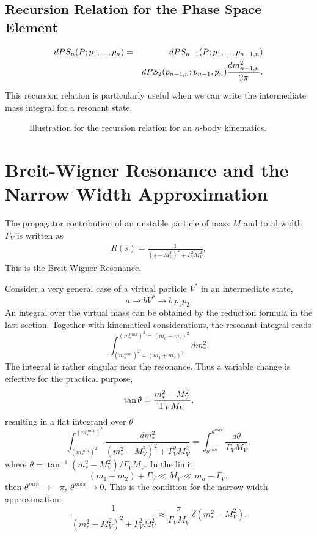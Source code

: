 \documentclass[prd,aps,floats,preprintnumbers,preprint,superscriptaddress,floatfix,nofootinbib]{revtex4}
\def\be{\begin{equation}}
\def\ee{\end{equation}}
\def\bea{\begin{eqnarray}}
\def\eea{\end{eqnarray}}
\begin{document}
\subsection{Recursion Relation for the Phase Space Element}
\label{rec}
\bea
\nonumber
dPS_n(P; p_1,...,p_n) &=& dPS_{n-1}(P; p_1,...,p_{n-1,n}) \\
                    && dPS_2(p_{n-1,n}; p_{n-1},p_n) {dm^2_{n-1,n}\over 2\pi}.
\eea

This recursion relation is particularly useful when we can write the intermediate 
mass integral for a resonant state. 

\begin{center}
\begin{figure}[tb]
\caption{Illustration for the recursion relation for an $n$-body kinematics.
\label{fig:p}}
\end{figure}
\end{center}

\section{Breit-Wigner Resonance and the Narrow Width Approximation}
\label{sec:BW}

The propagator contribution of an unstable particle of mass $M$ and total width 
$\Gamma_V$ is written as 
\bea
R(s) = \frac{1}{ (s-M^2_V)^2 + \Gamma_V^2 M_V^2} ,
\label{BW}
\eea 
This is the Breit-Wigner Resonance. 

Consider a very general case of a virtual particle $V^*$ 
in an intermediate state, 
\be
a \to b V^* \to b\ p_1 p_2.
\ee
An integral over the virtual mass can be obtained by the reduction
formula in the last section. Together with kinematical considerations, 
the resonant integral reads
\be
\int_{(m^{min}_*)^2=(m_1+m_2)^2}^{(m^{max}_*)^2=(m_a-m_b)^2}
 {dm_*^2}.
\ee
The integral is rather singular near the resonance. Thus a variable
change is effective for the practical purpose,
\be
\tan\theta ={ {m_*^2 - M_V^2}\over {\Gamma_V M_V} },
\ee
resulting in a flat integrand over $\theta$
\be
\int_{(m^{min}_*)^2}^{(m^{max}_*)^2}
\frac{dm_*^2}{ (m^2_* - M^2_V)^2 + \Gamma_V^2 M_V^2} 
= \int_{\theta^{min}}^{\theta^{max}} \frac{d\theta }{\Gamma_V M_V} ,
\ee
where $\theta = \tan^{-1}(m_*^2 - M_V^2)/ \Gamma_V M_V$.
In the limit 
\be
(m_1+m_2)+\Gamma_V \ll M_V  \ll m_a - \Gamma_V,
\ee
then $\theta^{min} \to -\pi,\ \theta^{max}\to 0$.
This is the condition for the narrow-width approximation:
\be
\frac{ 1 }{ (m^2_* - M^2_V)^2 + \Gamma_V^2 M_V^2} \approx 
\frac{ \pi }{\Gamma_V M_V}\ \delta(m^2_* - M^2_V).
\ee
 
\end{document}
